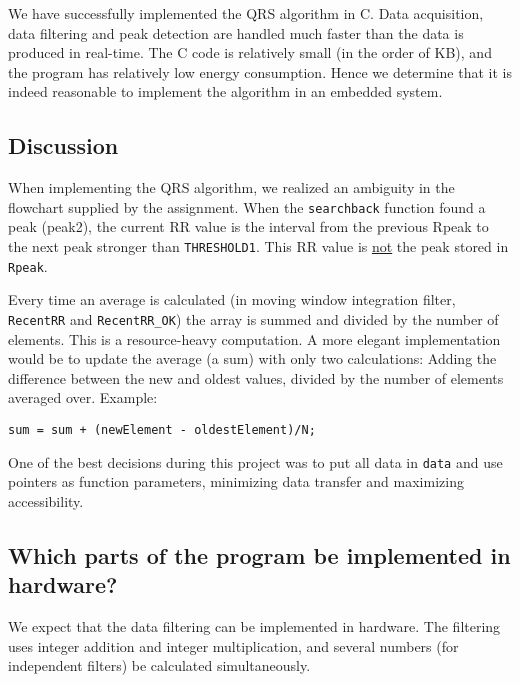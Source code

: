 We have successfully implemented the QRS algorithm in C. Data acquisition, data filtering and peak detection are handled much faster than the data is produced in real-time. The C code is relatively small (in the order of KB), and the program has relatively low energy consumption. Hence we determine that it is indeed reasonable to implement the algorithm in an embedded system.

\subsection{Discussion}
When implementing the QRS algorithm, we realized an ambiguity in the flowchart supplied by the assignment. When the \texttt{searchback} function found a peak (peak2), the current RR value is the interval from the previous Rpeak to the next peak stronger than \texttt{THRESHOLD1}. This RR value is \underline{not} the peak stored in \texttt{Rpeak}.

Every time an average is calculated (in moving window integration filter, \texttt{RecentRR} and \texttt{RecentRR\_OK}) the array is summed and divided by the number of elements. This is a resource-heavy computation. A more elegant implementation would be to update the average (a sum) with only two calculations: Adding the difference between the new and oldest values, divided by the number of elements averaged over. Example:

\begin{lstlisting}
sum = sum + (newElement - oldestElement)/N;
\end{lstlisting}

One of the best decisions during this project was to put all data in \texttt{data} and use pointers as function parameters, minimizing data transfer and maximizing accessibility. 

\subsection{Which parts of the program be implemented in hardware?}
We expect that the data filtering can be implemented in hardware. The filtering uses integer addition and integer multiplication, and several numbers (for independent filters) be calculated simultaneously. 

